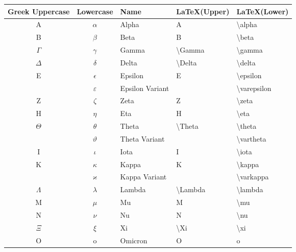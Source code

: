 \begin{table}[!htb]
\begin{tabularx}{\linewidth}{ c c l l l } \hline
  Greek Uppercase & Lowercase & Name  & \LaTeX (Upper)       & \LaTeX (Lower) \\
  \hline
  A               & $\alpha$   & Alpha   & A                     & \textbackslash alpha \\
  B               & $\beta$    & Beta    & B                     & \textbackslash beta \\
  $\Gamma$        & $\gamma$   & Gamma   & \textbackslash Gamma  & \textbackslash gamma \\
  $\Delta$        & $\delta$   & Delta   & \textbackslash Delta  & \textbackslash delta \\
  E               & $\epsilon$ & Epsilon & E                     & \textbackslash epsilon \\
                 & $\varepsilon$ & Epsilon Variant &            & \textbackslash varepsilon \\
  Z               & $\zeta$    & Zeta    & Z                     & \textbackslash zeta \\
  H               & $\eta$     & Eta     & H                     & \textbackslash eta \\
  $\Theta$        & $\theta$   & Theta   & \textbackslash Theta  & \textbackslash theta \\
                 & $\vartheta$ & Theta Variant &                  & \textbackslash vartheta \\
  I               & $\iota$    & Iota    & I                     & \textbackslash iota \\
  K               & $\kappa$   & Kappa   & K                     & \textbackslash kappa \\
                 & $\varkappa$ & Kappa Variant &                  & \textbackslash varkappa \\
  $\Lambda$       & $\lambda$  & Lambda  & \textbackslash Lambda & \textbackslash lambda \\
  M               & $\mu$      & Mu      & M                     & \textbackslash mu \\
  N               & $\nu$      & Nu      & N                     & \textbackslash nu \\
  $\Xi$           & $\xi$      & Xi      & \textbackslash Xi     & \textbackslash xi \\
  O               & o          & Omicron & O                     & o \\

\end{tabularx}
\end{table}
